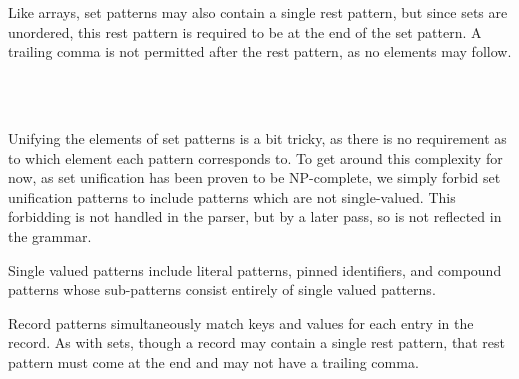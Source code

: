 Like arrays, set patterns may also contain a single rest pattern, but since sets
are unordered, this rest pattern is required to be at the end of the set pattern.
A trailing comma is not permitted after the rest pattern, as no elements may follow.

\begin{bnf*}
     \\
     \\
\end{bnf*}

Unifying the elements of set patterns is a bit tricky, as there is no requirement
as to which element each pattern corresponds to. To get around this complexity for
now, as set unification has been proven to be NP-complete\cite{setunif}, we simply
forbid set unification patterns to include patterns which are not single-valued.
This forbidding is not handled in the parser, but by a later pass, so is not reflected
in the grammar.

Single valued patterns include literal patterns, pinned identifiers, and compound
patterns whose sub-patterns consist entirely of single valued patterns.

\begin{prooftree}
\end{prooftree}

\begin{prooftree}
\end{prooftree}

Record patterns simultaneously match keys and values for each entry in
the record. As with sets, though a record may contain a single rest pattern,
that rest pattern must come at the end and may not have a trailing comma.

